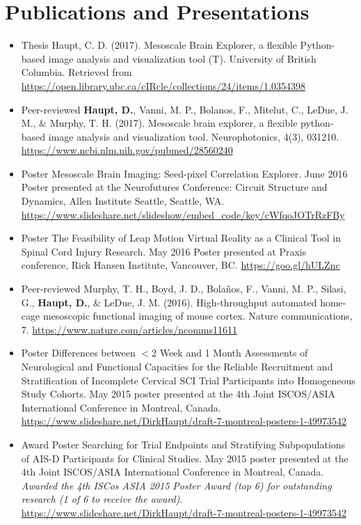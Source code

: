 \documentclass[11pt,a4paper,sans]{moderncv}        %
\begin{document}
\section{Publications and Presentations}
  \begin{itemize}
  \item{Thesis}
      {Haupt, C. D. (2017). Mesoscale Brain Explorer, a flexible Python-based image analysis and visualization tool (T). University of British Columbia. Retrieved from \href{https://open.library.ubc.ca/cIRcle/collections/24/items/1.0354398}{https://open.library.ubc.ca/cIRcle/collections/24/items/1.0354398}}
    \item{Peer-reviewed}
      {\textbf{Haupt, D.}, Vanni, M. P., Bolanos, F., Mitelut, C., LeDue, J. M., \& Murphy, T. H. (2017). Mesoscale brain explorer, a flexible python-based image analysis and visualization tool. Neurophotonics, 4(3), 031210. \href{https://www.ncbi.nlm.nih.gov/pubmed/28560240}{https://www.ncbi.nlm.nih.gov/pubmed/28560240}}
    \item{Poster}
      {Mesoscale Brain Imaging: Seed-pixel Correlation Explorer. June 2016 Poster presented at the Neurofutures Conference: Circuit Structure and Dynamics, Allen Institute Seattle, Seattle,  WA. \href{https://www.slideshare.net/slideshow/embed\_code/key/cWfqoJOTrRzFBy}{https://www.slideshare.net/slideshow/embed\_code/key/cWfqoJOTrRzFBy}}
    \item{Poster}
      {The Feasibility of Leap Motion Virtual Reality as a Clinical Tool in Spinal Cord Injury Research. May 2016 Poster presented at Praxis conference, Rick Hansen Institute, Vancouver, BC. \href{https://goo.gl/hULZnc}{https://goo.gl/hULZnc}}
          \item{Peer-reviewed}
          {Murphy, T. H., Boyd, J. D., Bolaños, F., Vanni, M. P., Silasi, G., \textbf{Haupt, D.}, \& LeDue, J. M. (2016). High-throughput automated home-cage mesoscopic functional imaging of mouse cortex. Nature communications, 7. \href{https://www.nature.com/articles/ncomms11611}{https://www.nature.com/articles/ncomms11611}}
          \item{Poster}
      {Differences between $<$2 Week and 1 Month Assessments of Neurological and Functional Capacities for the Reliable Recruitment and Stratification of Incomplete Cervical SCI Trial Participants into Homogeneous Study Cohorts. May 2015 poster presented at the 4th Joint ISCOS/ASIA International Conference in Montreal, Canada. \href{https://www.slideshare.net/DirkHaupt/draft-7-montreal-posters-1-49973542}{https://www.slideshare.net/DirkHaupt/draft-7-montreal-posters-1-49973542}}
          \item{Award Poster}
      {Searching for Trial Endpoints and Stratifying Subpopulations of AIS-D Participants for Clinical Studies. May 2015 poster presented at the 4th Joint ISCOS/ASIA International Conference in Montreal, Canada. \textit{Awarded the 4th ISCos ASIA 2015 Poster Award (top 6) for outstanding research (1 of 6 to receive the award)}. \href{https://www.slideshare.net/DirkHaupt/draft-7-montreal-posters-1-49973542}{https://www.slideshare.net/DirkHaupt/draft-7-montreal-posters-1-49973542}}
  \end{itemize}
\end{document}
